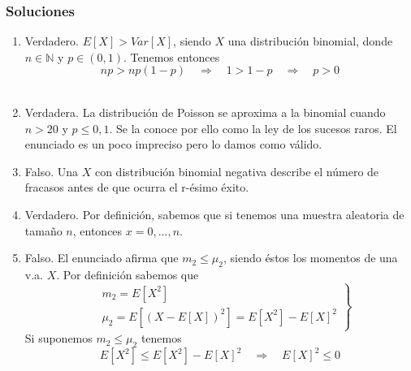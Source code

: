 \documentclass[fleqn]{article}
\def\N{\mathds{N}}
\def\next{\quad \Rightarrow \quad}
\begin{document}
\begin{enumerate}
                \newpage 

                \subsubsection{Soluciones}

                        \begin{enumerate}
                                \item Verdadero. $E[X] > Var[X]$, siendo $X$ una distribución binomial, donde $n \in \N$ y $ p \in (0,1)$. 
                                        Tenemos entonces
                                        $$np > np(1-p) \next 1>1-p \next p>0$$\\
                                \item Verdadera. La distribución de Poisson se aproxima a la binomial cuando $n>20$ y $p\leq 0,1$. Se la conoce 
                                        por ello como la ley de los sucesos raros. El enunciado es un poco impreciso pero lo damos como válido.\\
                                \item Falso. Una $X$ con distribución binomial negativa describe el número de fracasos antes de que ocurra el 
                                        r-ésimo éxito.\\
                                \item Verdadero. Por definición, sabemos que si tenemos una muestra aleatoria de tamaño $n$, entonces 
                                        $x=0, ... , n$.\\
                                \item Falso. El enunciado afirma que $m_2 \leq \mu_2$, siendo éstos los momentos de una v.a. $X$. Por definición sabemos
                                        que 
                                        $$\left.
                                        \begin{aligned}
                                                &m_2 = E[X^2] \\
                                                &\mu_2 = E[(X- E[X])^2] = E[X^2]- E[X]^2
                                        \end{aligned}
                                        \right\}
                                        $$
                                        Si suponemos $m_2 \leq \mu_2$ tenemos
                                        $$E[X^2] \leq E[X^2] - E[X]^2  \next  E[X]^2 \leq 0$$

\end{enumerate}
\end{enumerate}
\end{document}
